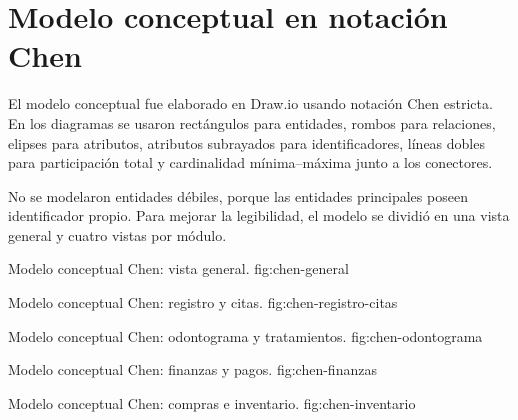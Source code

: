 \section{Modelo conceptual en notación Chen}

El modelo conceptual fue elaborado en Draw.io usando notación Chen estricta. En los diagramas se usaron rectángulos para entidades, rombos para relaciones, elipses para atributos, atributos subrayados para identificadores, líneas dobles para participación total y cardinalidad mínima--máxima junto a los conectores.

No se modelaron entidades débiles, porque las entidades principales poseen identificador propio. Para mejorar la legibilidad, el modelo se dividió en una vista general y cuatro vistas por módulo.

{Modelo conceptual Chen: vista general.}
{fig:chen-general}

{Modelo conceptual Chen: registro y citas.}
{fig:chen-registro-citas}

{Modelo conceptual Chen: odontograma y tratamientos.}
{fig:chen-odontograma}

{Modelo conceptual Chen: finanzas y pagos.}
{fig:chen-finanzas}

{Modelo conceptual Chen: compras e inventario.}
{fig:chen-inventario}
